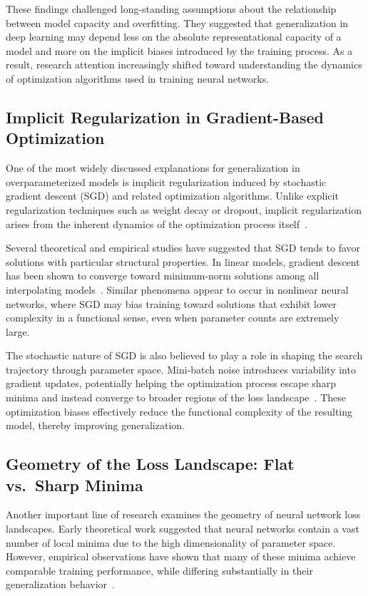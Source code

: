 \documentclass[conference]{IEEEtran}
\begin{document}
These findings challenged long-standing assumptions about the relationship between model capacity and overfitting. They suggested that generalization in deep learning may depend less on the absolute representational capacity of a model and more on the implicit biases introduced by the training process. As a result, research attention increasingly shifted toward understanding the dynamics of optimization algorithms used in training neural networks.

\subsection{Implicit Regularization in Gradient-Based Optimization}

One of the most widely discussed explanations for generalization in overparameterized models is implicit regularization induced by stochastic gradient descent (SGD) and related optimization algorithms. Unlike explicit regularization techniques such as weight decay or dropout, implicit regularization arises from the inherent dynamics of the optimization process itself~\cite{neyshabur2017exploring}.

Several theoretical and empirical studies have suggested that SGD tends to favor solutions with particular structural properties. In linear models, gradient descent has been shown to converge toward minimum-norm solutions among all interpolating models~\cite{arora2019implicit}. Similar phenomena appear to occur in nonlinear neural networks, where SGD may bias training toward solutions that exhibit lower complexity in a functional sense, even when parameter counts are extremely large.

The stochastic nature of SGD is also believed to play a role in shaping the search trajectory through parameter space. Mini-batch noise introduces variability into gradient updates, potentially helping the optimization process escape sharp minima and instead converge to broader regions of the loss landscape~\cite{keskar2017large}. These optimization biases effectively reduce the functional complexity of the resulting model, thereby improving generalization.

\subsection{Geometry of the Loss Landscape: Flat vs.\ Sharp Minima}

Another important line of research examines the geometry of neural network loss landscapes. Early theoretical work suggested that neural networks contain a vast number of local minima due to the high dimensionality of parameter space. However, empirical observations have shown that many of these minima achieve comparable training performance, while differing substantially in their generalization behavior~\cite{li2018visualizing}.
\end{document}
